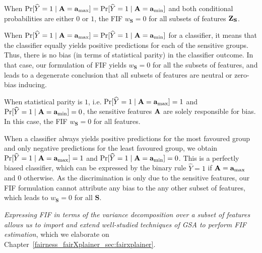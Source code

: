 \begin{proposition}
	When $ \Pr[\widehat{Y} = 1 \mid \mathbf{A} = \mathbf{a}_{\max} ] = \Pr[\widehat{Y} = 1 \mid \mathbf{A} = \mathbf{a}_{\min} ] $ and both conditional probabilities are either $ 0 $ or $ 1 $, the FIF $w_{\mathbf{S}}  = 0 $ for all subsets of features $ \mathbf{Z}_{\mathbf{S}} $.
\end{proposition}
When $ \Pr[\widehat{Y} = 1 \mid \mathbf{A} = \mathbf{a}_{\max} ] = \Pr[\widehat{Y} = 1 \mid \mathbf{A} = \mathbf{a}_{\min} ] $ for a classifier, it means that the classifier equally yields positive predictions for each of the sensitive groups. Thus, there is no bias (in terms of statistical parity) in the classifier outcome. In that case, our formulation of FIF yields $w_{\mathbf{S}}  = 0 $ for all the subsets of features, and leads to a degenerate conclusion that all subsets of features are neutral or zero-bias inducing.
\begin{proposition}
	{When statistical parity is $ 1 $, i.e. $ \Pr[\widehat{Y} = 1 \mid \mathbf{A} = \mathbf{a}_{\max} ] = 1 $ and $ \Pr[\widehat{Y} = 1 \mid \mathbf{A} = \mathbf{a}_{\min} ] = 0 $, the sensitive features $ \mathbf{A} $ are solely responsible for bias. In this case, the FIF $ w_{\mathbf{S}} = 0 $ for all features.}
\end{proposition}
When a classifier always yields positive predictions for the most favoured group and only negative predictions for the least favoured group, we obtain $ \Pr[\widehat{Y} = 1 \mid \mathbf{A} = \mathbf{a}_{\max} ] = 1 $ and $ \Pr[\widehat{Y} = 1 \mid \mathbf{A} = \mathbf{a}_{\min} ] = 0 $. This is a perfectly biased classifier, which can be expressed by the binary rule $\widehat{Y} = 1$ if $\mathbf{A} = \mathbf{a}_{\max}$ and $0$ otherwise. As the discrimination is only due to the sensitive features, our FIF formulation cannot attribute any bias to the any other subset of  features, which leads to $ w_{\mathbf{S}} = 0 $ for all $\mathbf{S}$.



\textit{Expressing FIF in terms of the variance decomposition over a subset of features allows us to import and extend well-studied techniques of GSA to perform FIF estimation}, which we elaborate on Chapter~\ref{fairness_fairXplainer_sec:fairxplainer}.
